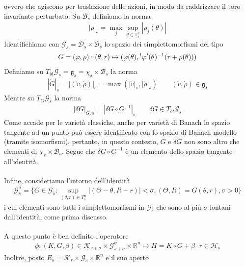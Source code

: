 \documentclass[twoside, 11pt]{amsbook}
\newcommand{\0}{{(0)}}
\newcommand{\3}{{(3)}}
\theoremstyle{colonplain}
\theoremstyle{colondefinition}
\theoremstyle{colonremark}
\numberwithin{equation}{chapter}
\begin{document}
ovvero che agiscono per traslazione delle azioni, in modo da raddrizzare il toro invariante perturbato. Su $\mathcal{B}_s$ definiamo la norma
\begin{align}
    |\rho|_s = \max_j \sup_{\theta \in \mathbb{T}^n_s} |\rho_j(\theta)|
\end{align}
Identifichiamo con $\mathcal{G}_s = \mathcal{D}_s \times \mathcal{B}_s$ lo spazio dei simplettomorfismi del tipo
\begin{align}
    G = (\varphi, \rho) : (\theta, r) \mapsto (\varphi(\theta), \null^t\varphi'(\theta)^{-1}(r + \rho(\theta)))
\end{align}
Definiamo su $T_{\mathrm{id}}\mathcal{G}_s = \mathfrak{g}_s = \chi_s \times \mathcal{B}_s$ la norma
\begin{align}
    |\dot{G}|_s = |(\dot{v}, \dot{\rho})|_s = \max(|\dot{v}|_s, |\dot{\rho}|_s) \qquad (\dot{v}, \dot{\rho}) \in \mathfrak{g}_s
\end{align}
Mentre su $T_G\mathcal{G}_s$ la norma
\begin{align}
    |\delta G|_{G, s} = |\delta G \circ G^{-1}|_s \qquad \delta G \in T_G\mathcal{G}_s
\end{align}
Come accade per le varietà classiche, anche per varietà di Banach lo spazio tangente ad un punto può essere identificato con lo spazio di Banach modello (tramite isomorfismi), pertanto, in questo contesto, $\dot{G}$ e $\delta G$ non sono altro che elementi di $\chi_s \times \mathcal{B}_s$. Segue che $\delta G \circ G^{-1}$ è un elemento dello spazio tangente all'identità. \\ \\
Infine, consideriamo l'intorno dell'identità
\begin{align}
    \mathcal{G}^\sigma_s = \{G \in \mathcal{G}_s : \sup_{(\theta, r) \in T^n_s} |(\Theta - \theta, R - r)| < \sigma, (\Theta, R) = G(\theta, r), \sigma > 0\}
\end{align}
i cui elementi sono tutti i simplettomorfismi in $\mathcal{G}_s$ che sono al più $\sigma$-lontani dall'identità, come prima discusso. \\ \\
A questo punto è ben definito l'operatore
\begin{align}
    \phi : (K, G, \beta) \in \mathcal{K}_{s + \sigma} \times \mathcal{G}^\sigma_{s + \sigma} \times \mathbb{R}^n \mapsto H = K \circ G + \beta \cdot r \in \mathcal{H}_s
\end{align}
Inoltre, posto $E_s = \mathcal{K}_s \times \mathcal{G}_s \times \mathbb{R}^n$ e il suo aperto
\end{document}
